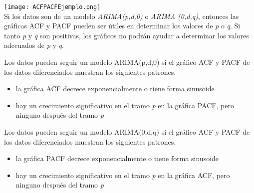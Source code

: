 \texttt{[image: ACFPACFEjemplo.png]}\\

Si los datos son de un modelo \textit{ARIMA(p,d,0)} o \textit{ARIMA (0,d,q)}, entonces las gráficas ACF y PACF pueden ser útiles en determinar los valores de \emph{p} o \emph{q}. Si tanto \emph{p} y \emph{q} son positivas, los gráficos no podrán ayudar a determinar los valores adecuados de \emph{p} y \emph{q}.

Los datos pueden seguir un modelo ARIMA(p,d,0) si el gráfico ACF y PACF de los datos diferenciados muestran los siguientes patrones.
\begin{itemize}
	\item la gráfica ACF decrece exponencialmente o tiene forma sinusoide
	\item hay un crecimiento significativo en el tramo \textit{p} en la gráfica PACF, pero ninguno después del tramo \textit{p}
\end{itemize}

Los datos pueden seguir un modelo ARIMA(0,d,q) si el gráfico ACF y PACF de los datos diferenciados muestran los siguientes patrones.
\begin{itemize}
	\item la gráfica PACF decrece exponencialmente o tiene forma sinusoide
	\item hay un crecimiento significativo en el tramo \textit{p} en la gráfica ACF, pero ninguno después del tramo \textit{p}
\end{itemize}
